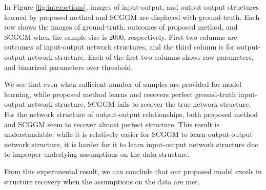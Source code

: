\documentclass{article}
\begin{document}
In Figure \ref{fig:interactions}, images of input-output, and output-output structures learned by proposed method and SCGGM are displayed with ground-truth.
Each row shows the images of ground-truth, outcomes of proposed method, and SCGGM when the sample size is 2000, respectively.
First two columns are outcomes of input-output network structures, and the third column is for output-output network structure. 
Each of the first two columns shows raw parameters, and binarized parameters over threshold.

We see that even when sufficient number of samples are provided for model learning, while proposed method learns and recovers perfect ground-truth input-output network structure, SCGGM fails to recover the true network structure. 
For the network structure of output-output relationships, both proposed method and SCGGM seem to recover almost perfect structure.
This result is understandable; while it is relatively easier for SCGGM to learn output-output network structure, it is harder for it to learn input-output network structure  due to improper underlying assumptions on the data structure.

From this experimental result, we can conclude that our proposed model excels in structure recovery when the assumptions on the data are met.
\end{document}
